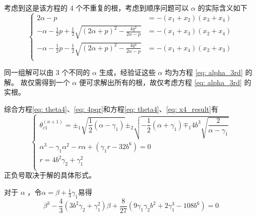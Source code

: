\documentclass[UTF8]{ctexart}
\begin{document}
				考虑到这是该方程的 4 个不重复的根，考虑到顺序问题可以 $\alpha$ 的实际含义如下
				\begin{equation}
					\begin{cases}
						2 \alpha - p                                                                                &= - (x_{1} + x_{2})(x_{3} + x_{4})    \\
						- \alpha - \frac{1}{2} p + \frac{1}{2} \sqrt{(2 \alpha + p)^2 - \frac{4 q^2}{2 \alpha - p}} &= - (x_{1} + x_{3})(x_{2} + x_{4})    \\
						- \alpha - \frac{1}{2} p - \frac{1}{2} \sqrt{(2 \alpha + p)^2 - \frac{4 q^2}{2 \alpha - p}} &= - (x_{1} + x_{4})(x_{2} + x_{3})    \\
					\end{cases}
				\end{equation}

				同一组解可以由 3 个不同的 $\alpha$ 生成，经验证这些 $\alpha$ 均为方程 \ref{eq: alpha_3rd} 的解。
				故仅需得到一个 $\alpha$ 便可求解出所有的根，故仅考虑方程 \ref{eq: alpha_3rd} 的实根。
				
				综合方程\ref{eq: theta4}、\ref{eq: 4pqr}和方程\ref{eq: theta4}、\ref{eq: x4_result}有
				\begin{equation}
					\begin{cases}
						\theta_{c1}^{(n + 1)} = \pm_{1} \sqrt{\dfrac{1}{2} (\alpha - \gamma_{1})} \pm_{2} \sqrt{- \dfrac{1}{2} (\alpha + \gamma_{1}) \mp_{1} 4 b^{3}\sqrt{\dfrac{2}{\alpha - \gamma_{1}}}}     \\
						\alpha^3 - \gamma_{1} \alpha^2 - r \alpha + (\gamma_{1} r - 32 b^{6}) = 0                                                                                                           \\
						r = 4 b^{2} \gamma_{2} + \gamma_{1}^{2}                                                                                                                                             \\
					\end{cases}
					\label{eq: x4 end}
				\end{equation}
				正负号取决于解的具体形式。
				\newpage

				对于 $\alpha$ ，令$\alpha = \beta + \frac{1}{3} \gamma_{1}$易得
				\begin{equation}
					\beta^3 - \dfrac{4}{3} \left(3 b^{2} \gamma_{2} + \gamma_{1}^{2}\right) \beta + \dfrac{8}{27}\left(9\gamma_{1} \gamma_{2} b^{2} + 2 \gamma_{1}^{3} - 108 b^{6}\right) = 0
					\label{eq: beta}
				\end{equation}
				
\end{document}
